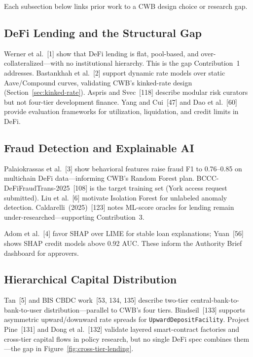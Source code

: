\documentclass[12pt,a4paper]{report}
\begin{document}
Each subsection below links prior work to a CWB design choice or research gap.

\subsection{DeFi Lending and the Structural Gap}

Werner et al.~[1] show that DeFi lending is flat, pool-based, and over-collateralized---with no institutional hierarchy. This is the gap Contribution~1 addresses. Bastankhah et al.~[2] support dynamic rate models over static Aave/Compound curves, validating CWB's kinked-rate design (Section~\ref{sec:kinked-rate}). Aspris and Svec~[118] describe modular risk curators but not four-tier development finance. Yang and Cui~[47] and Dao et al.~[60] provide evaluation frameworks for utilization, liquidation, and credit limits in DeFi.

\subsection{Fraud Detection and Explainable AI}
\label{sec:lit-ml-oracle}

Palaiokrassas et al.~[3] show behavioral features raise fraud F1 to 0.76--0.85 on multichain DeFi data---informing CWB's Random Forest plan. BCCC-DeFiFraudTrans-2025~[108] is the target training set (York access request submitted). Liu et al.~[6] motivate Isolation Forest for unlabeled anomaly detection. Caldarelli~(2025)~[123] notes ML-score oracles for lending remain under-researched---supporting Contribution~3.

Adom et al.~[4] favor SHAP over LIME for stable loan explanations; Yuan~[56] shows SHAP credit models above 0.92 AUC. These inform the Authority Brief dashboard for approvers.

\subsection{Hierarchical Capital Distribution}
\label{sec:lit-cross-tier}

Tan~[5] and BIS CBDC work~[53, 134, 135] describe two-tier central-bank-to-bank-to-user distribution---parallel to CWB's four tiers. Bindseil~[133] supports asymmetric upward/downward rate spreads for \texttt{UpwardDepositFacility}. Project Pine~[131] and Dong et al.~[132] validate layered smart-contract factories and cross-tier capital flows in policy research, but no single DeFi spec combines them---the gap in Figure~\ref{fig:cross-tier-lending}.
\end{document}
